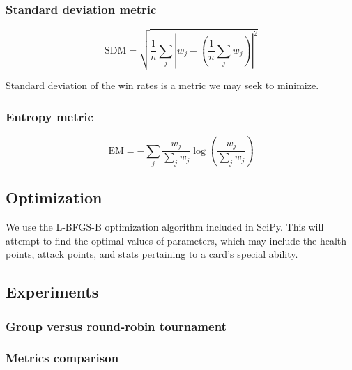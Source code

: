 \subsubsection{Standard deviation metric}

\begin{equation}
	\mathrm{SDM} = \sqrt{\frac{1}{n} \sum_j \left|w_j - \left(\frac{1}{n}\sum_j w_j\right)\right|^2}
\end{equation}

Standard deviation of the win rates is a metric we may seek to minimize.

\subsubsection{Entropy metric}

\begin{equation}
	\mathrm{EM} = -\sum_j \frac{w_j}{\sum_j w_j} \log\left(\frac{w_j}{\sum_j w_j}\right)
\end{equation}

\subsection{Optimization}

We use the L-BFGS-B optimization algorithm included in SciPy. This will attempt to find the optimal values of 
parameters, which may include the health points, attack points, and stats pertaining to a 
card's special ability.

\subsection{Experiments}

\subsubsection{Group versus round-robin tournament}

\subsubsection{Metrics comparison}